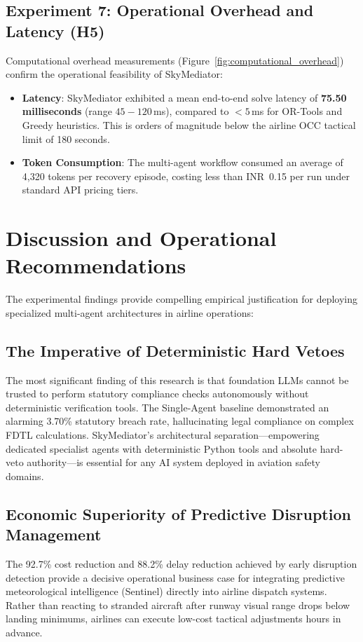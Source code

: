 \subsection{Experiment 7: Operational Overhead and Latency (H5)}
Computational overhead measurements (Figure~\ref{fig:computational_overhead}) confirm the operational feasibility of SkyMediator:
\begin{itemize}
    \item \textbf{Latency}: SkyMediator exhibited a mean end-to-end solve latency of \textbf{75.50 milliseconds} (range $45-120\,$ms), compared to $<5\,$ms for OR-Tools and Greedy heuristics. This is orders of magnitude below the airline OCC tactical limit of 180 seconds.
    \item \textbf{Token Consumption}: The multi-agent workflow consumed an average of 4,320 tokens per recovery episode, costing less than INR~0.15 per run under standard API pricing tiers.
\end{itemize}

\section{Discussion and Operational Recommendations}
\label{sec:discussion}

The experimental findings provide compelling empirical justification for deploying specialized multi-agent architectures in airline operations:

\subsection{The Imperative of Deterministic Hard Vetoes}
The most significant finding of this research is that foundation LLMs cannot be trusted to perform statutory compliance checks autonomously without deterministic verification tools. The Single-Agent baseline demonstrated an alarming 3.70\% statutory breach rate, hallucinating legal compliance on complex FDTL calculations. SkyMediator's architectural separation---empowering dedicated specialist agents with deterministic Python tools and absolute hard-veto authority---is essential for any AI system deployed in aviation safety domains.

\subsection{Economic Superiority of Predictive Disruption Management}
The 92.7\% cost reduction and 88.2\% delay reduction achieved by early disruption detection provide a decisive operational business case for integrating predictive meteorological intelligence (Sentinel) directly into airline dispatch systems. Rather than reacting to stranded aircraft after runway visual range drops below landing minimums, airlines can execute low-cost tactical adjustments hours in advance.

